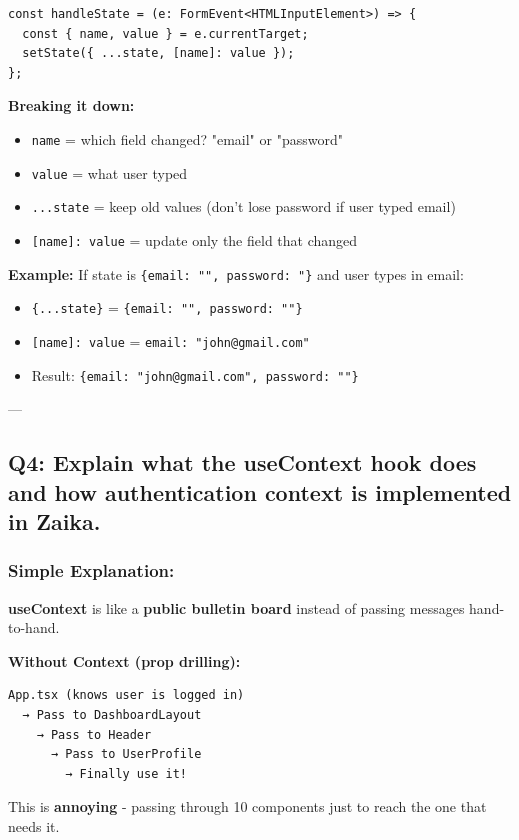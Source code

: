 \documentclass[12pt]{article}
\begin{document}
\begin{lstlisting}
const handleState = (e: FormEvent<HTMLInputElement>) => {
  const { name, value } = e.currentTarget;
  setState({ ...state, [name]: value });
};
\end{lstlisting}

\textbf{Breaking it down:}
\begin{itemize}
    \item \texttt{name} = which field changed? "email" or "password"
    \item \texttt{value} = what user typed
    \item \texttt{...state} = keep old values (don't lose password if user typed email)
    \item \texttt{[name]: value} = update only the field that changed
\end{itemize}

\textbf{Example:} If state is \texttt{\{email: "", password: "\}} and user types in email:
\begin{itemize}
    \item \texttt{\{...state\}} = \texttt{\{email: "", password: ""\}}
    \item \texttt{[name]: value} = \texttt{email: "john@gmail.com"}
    \item Result: \texttt{\{email: "john@gmail.com", password: ""\}}
\end{itemize}

---

\subsection{Q4: Explain what the useContext hook does and how authentication context is implemented in Zaika.}

\subsubsection*{Simple Explanation:}

\textbf{useContext} is like a \textbf{public bulletin board} instead of passing messages hand-to-hand.

\textbf{Without Context (prop drilling):}
\begin{lstlisting}
App.tsx (knows user is logged in)
  → Pass to DashboardLayout
    → Pass to Header
      → Pass to UserProfile
        → Finally use it!
\end{lstlisting}

This is \textbf{annoying} - passing through 10 components just to reach the one that needs it.
\end{document}
